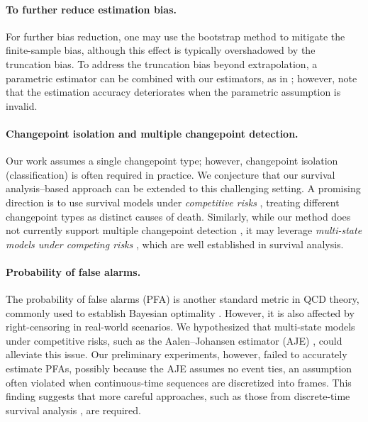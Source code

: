 \documentclass{article}
\theoremstyle{plain}
\theoremstyle{definition}
\theoremstyle{remark}
\begin{document}
\paragraph{To further reduce estimation bias.}
For further bias reduction, one may use the bootstrap method \citep{efron1994introduction} to mitigate the finite-sample bias, although this effect is typically overshadowed by the truncation bias.
To address the truncation bias beyond extrapolation, a parametric estimator can be combined with our estimators, as in \citep{sahki2020performance}; however, note that the estimation accuracy deteriorates when the parametric assumption is invalid.

\paragraph{Changepoint isolation and multiple changepoint detection.}
Our work assumes a single changepoint type; however, changepoint isolation (classification) \citep{tartakovsky2014TartarBook} is often required in practice.
We conjecture that our survival analysis–based approach can be extended to this challenging setting.
A promising direction is to use survival models under \textit{competitive risks} \citep{morita2021introduction}, treating different changepoint types as distinct causes of death.
Similarly, while our method does not currently support multiple changepoint detection \citep{niu2016multiple}, it may leverage \textit{multi-state models under competing risks} \citep{therneau2020multi, beyersmann2011competing, mills2011competing}, which are well established in survival analysis.

\paragraph{Probability of false alarms.}
The probability of false alarms (PFA) is another standard metric in QCD theory, commonly used to establish Bayesian optimality \citep{tartakovsky2019sequential_TartarBookQCD}.
However, it is also affected by right-censoring in real-world scenarios.
We hypothesized that multi-state models under competitive risks, such as the Aalen–Johansen estimator (AJE) \citep{aalen1978empirical_AJE_org}, could alleviate this issue.
Our preliminary experiments, however, failed to accurately estimate PFAs, possibly because the AJE assumes no event ties, an assumption often violated when continuous-time sequences are discretized into frames.
This finding suggests that more careful approaches, such as those from discrete-time survival analysis \citep{tutz2016modeling}, are required.
\end{document}
